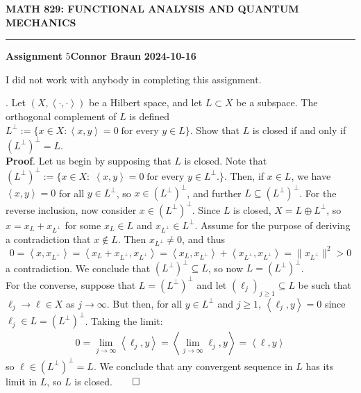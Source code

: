 \documentclass[10pt]{article}
\newcommand{\1}[1]{\mathbbm{1}_{#1}} \newcommand{\mc}[1]{\mathcal{#1}}
\newcommand{\ip}[2]{\left\langle#1,#2\right\rangle }
\begin{document}
    \begin{center}
        {\bf\large{MATH 829: FUNCTIONAL ANALYSIS AND QUANTUM MECHANICS}}
        \smallskip
        \hrule
        \smallskip
        {\bf Assignment} 5\hfill {\bf Connor Braun} \hfill {\bf 2024-10-16}
    \end{center}
    \vspace{5pt}
    \begin{center}
        \begin{minipage}{\dimexpr\paperwidth-10cm}
            I did not work with anybody in completing this assignment.
        \end{minipage}
    \end{center}
    . Let $(X,\ip{\cdot}{\cdot})$ be a Hilbert space, and let $L\subset X$ be a subspace. The orthogonal complement of $L$ is defined $L^\perp:=\{x\in X:\ip{x}{y}=0\;\text{for every $y\in L$}\}$. Show that $L$ is closed if and only if $(L^\perp)^\perp=L$.\\[5pt]
    {\bf Proof}. Let us begin by supposing that $L$ is closed. Note that $(L^\perp)^\perp:=\{x\in X:\;\ip{x}{y}=0\;\text{for every $y\in L^\perp$.}\}$. Then, if $x\in L$, we have $\ip{x}{y}=0$ for all $y\in L^\perp$, so $x\in (L^\perp)^\perp$, and further $L\subseteq (L^\perp)^\perp$.
    For the reverse inclusion, now consider $x\in (L^\perp)^\perp$. Since $L$ is closed, $X=L\oplus L^\perp$, so $x=x_L+x_{L^\perp}$ for some $x_L\in L$ and $x_{L^\perp}\in L^\perp$. Assume for the purpose of deriving a contradiction that $x\notin L$. Then $x_{L^\perp}\neq 0$, 
    and thus
    \[0=\ip{x}{x_{L^\perp}}=\ip{x_L+x_{L^\perp}}{x_{L^\perp}}=\ip{x_L}{x_{L^\perp}}+\ip{x_{L^\perp}}{x_{L^\perp}}=\|x_{L^\perp}\|^2>0\]
    a contradiction. We conclude that $(L^\perp)^\perp\subseteq L$, so now $L=(L^\perp)^\perp$.\\[5pt]
    For the converse, suppose that $L=(L^\perp)^\perp$ and let $(\ell_j)_{j\geq 1}\subseteq L$ be such that $\ell_j\rightarrow\ell\in X$ as $j\rightarrow\infty$. But then, for all $y\in L^\perp$ and $j\geq 1$, $\ip{\ell_j}{y}=0$ since $\ell_j\in L=(L^\perp)^\perp$. Taking the limit:
    \begin{align*}
        0=\lim_{j\rightarrow\infty}\ip{\ell_j}{y}=\ip{\lim_{j\rightarrow\infty}\ell_j}{y}=\ip{\ell}{y}
    \end{align*}
    so $\ell\in (L^\perp)^\perp=L$. We conclude that any convergent sequence in $L$ has its limit in $L$, so $L$ is closed.\hfill{$\qed$} 
\end{document}
